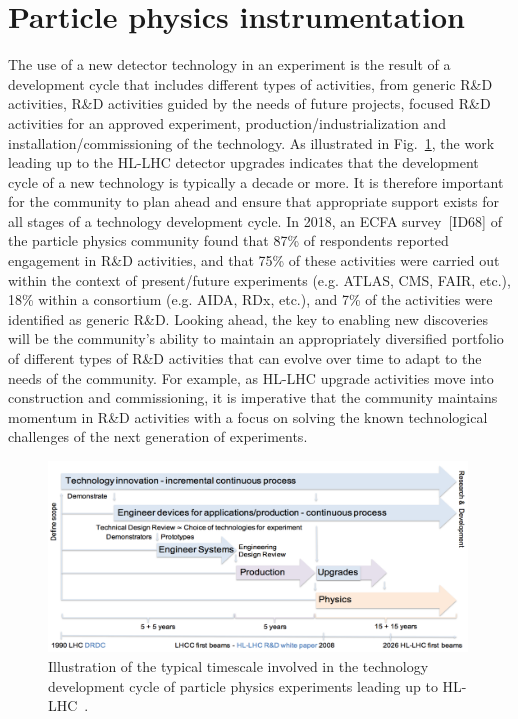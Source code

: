 \section{Particle physics instrumentation}

The use of a new detector technology in an experiment is the result of a development cycle that includes different types of activities, from generic R\&D activities, R\&D activities guided by the needs of future projects, 
focused R\&D activities for an approved experiment, production/industrialization and installation/commissioning of the technology.  As illustrated in Fig.~\ref{fig:RandD}, the work leading up to the HL-LHC detector upgrades indicates that the development cycle of a new technology is typically a decade or more.  It is therefore important for the community to plan ahead and ensure that appropriate support exists for all stages of a technology development cycle.  In 2018, an ECFA survey~[ID68] of the particle physics community found that 87\% of respondents reported engagement in R\&D activities, and that 75\% of these activities were carried out within the context of  present/future experiments (e.g. ATLAS, CMS, FAIR, etc.), 18\% within a consortium (e.g. AIDA, RDx, etc.), and 7\% of the activities were identified as generic R\&D. Looking ahead, the key to enabling new discoveries will be the community's ability to maintain an appropriately diversified portfolio of different types of R\&D activities that can evolve over time to adapt to the needs of the community.  For example, as HL-LHC upgrade activities move into construction and commissioning, it is imperative that the community maintains momentum in R\&D activities with a focus on solving the known technological challenges of the next generation of experiments. 




\begin{figure}
\begin{center}
\includegraphics[width=0.99\textwidth]{Instrum/img/RandD-timeline.pdf}
\caption{\label{fig:RandD} Illustration of the typical timescale involved in the technology development cycle of particle physics experiments leading up to HL-LHC~\cite{bib:DC-talk}.}
\end{center}
\end{figure}



